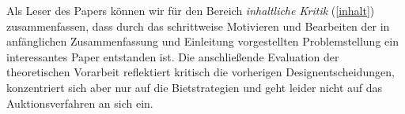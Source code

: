 \documentclass[sigconf]{acmart}
\begin{document}
Als Leser des Papers können wir für den Bereich \textit{inhaltliche Kritik} (\ref{inhalt}) zusammenfassen, dass durch das schrittweise Motivieren und Bearbeiten der in anfänglichen Zusammenfassung und Einleitung vorgestellten  Problemstellung ein interessantes Paper entstanden ist. Die anschließende Evaluation der theoretischen Vorarbeit reflektiert kritisch die vorherigen Designentscheidungen, konzentriert sich aber nur auf die Bietstrategien und geht leider nicht auf das Auktionsverfahren an sich ein.
\end{document}
